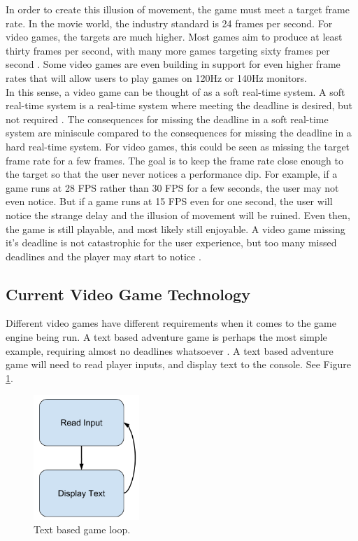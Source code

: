 \documentclass[a4paper, 12pt]{article}
\begin{document}
        In order to create this illusion of movement, the game must meet a target frame rate. In the movie world, the industry standard is 24 frames per second. For video games, the targets are much higher. Most games aim to produce at least thirty frames per second, with many more games targeting sixty frames per second \cite{fps}. Some video games are even building in support for even higher frame rates that will allow users to play games on 120Hz or 140Hz monitors. \\

        In this sense, a video game can be thought of as a soft real-time system. A soft real-time system is a real-time system where meeting the deadline is desired, but not required \cite{wiki_rts}. The consequences for missing the deadline in a soft real-time system are miniscule compared to the consequences for missing the deadline in a hard real-time system. For video games, this could be seen as missing the target frame rate for a few frames. The goal is to keep the frame rate close enough to the target so that the user never notices a performance dip. For example, if a game runs at 28 FPS rather than 30 FPS for a few seconds, the user may not even notice. But if a game runs at 15 FPS even for one second, the user will notice the strange delay and the illusion of movement will be ruined. Even then, the game is still playable, and most likely still enjoyable. A video game missing it's deadline is not catastrophic for the user experience, but too many missed deadlines and the player may start to notice \cite{morefps}. \\

    \subsection{Current Video Game Technology}

        Different video games have different requirements when it comes to the game engine being run. A text based adventure game is perhaps the most simple example, requiring almost no deadlines whatsoever \cite{textb}. A text based adventure game will need to read player inputs, and display text to the console. See Figure \ref{text_based_loop}.
        \\

        \begin{figure}[H]
            \includegraphics[width=4cm]{text_based_loop.png}
            \centering
            \caption{Text based game loop.}
            \label{text_based_loop}
        \end{figure}
\end{document}
